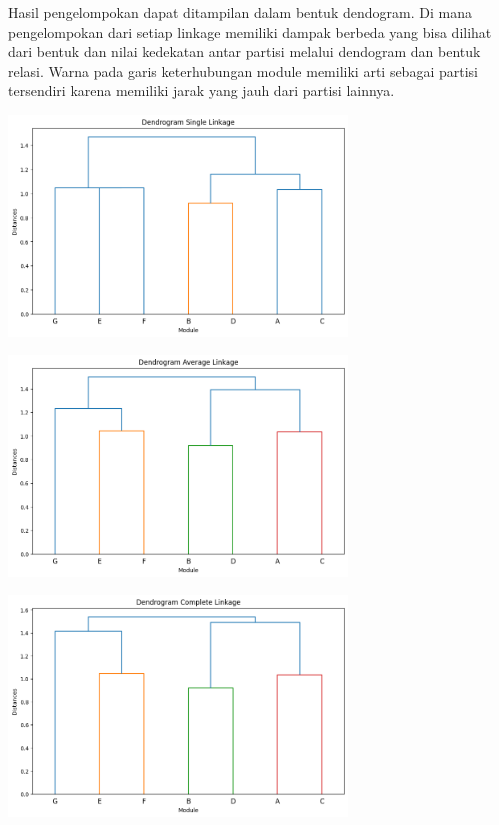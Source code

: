 Hasil pengelompokan dapat ditampilan dalam bentuk dendogram.  Di mana pengelompokan dari setiap linkage memiliki dampak berbeda yang bisa dilihat dari bentuk dan nilai kedekatan antar partisi melalui dendogram dan bentuk relasi. Warna pada garis keterhubungan module memiliki arti sebagai partisi tersendiri karena memiliki jarak yang jauh dari partisi lainnya. 
\begin{center}
	\includegraphics[width=9cm]{img/bab_3/singleLink.png}
	\label{fig:asd}
\end{center}
\begin{center}
	\includegraphics[width=9cm]{img/bab_3/averageLink.png}
	\label{fig:asd}
\end{center}
\begin{center}
	\includegraphics[width=9cm]{img/bab_3/completeLink.png}
	\label{fig:asd}
\end{center}

